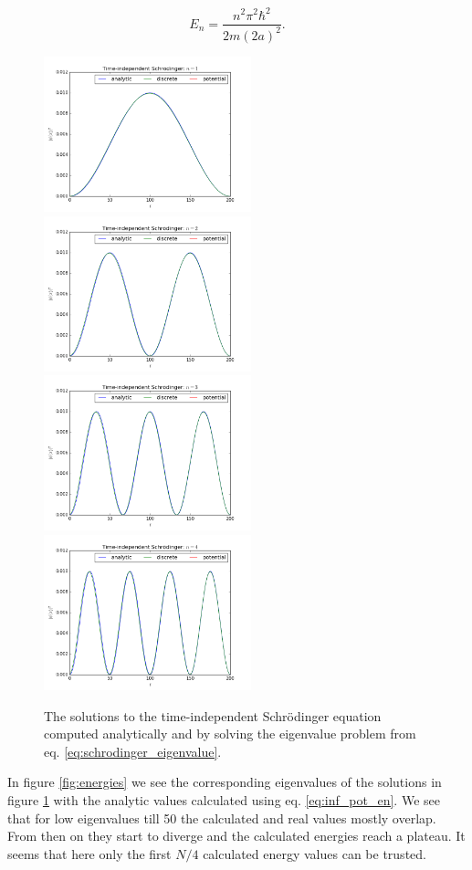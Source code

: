 \documentclass[a4paper]{article}
\begin{document}
\begin{equation} \label{eq:inf_pot_en}
    E_n = \frac{n^2 \pi^2 \hbar^2}{2m(2a)^2}.
\end{equation}

\begin{figure}
\centering
\includegraphics[width=6cm]{infinite_1}
\includegraphics[width=6cm]{infinite_2}
\includegraphics[width=6cm]{infinite_3}
\includegraphics[width=6cm]{infinite_4}
\caption{The solutions to the time-independent Schr\"odinger equation computed analytically and by solving the eigenvalue problem from eq. \ref{eq:schrodinger_eigenvalue}.}
\label{fig:infinite}
\end{figure}

In figure \ref{fig:energies} we see the corresponding eigenvalues of the solutions in figure \ref{fig:infinite} with the analytic values calculated using eq. \ref{eq:inf_pot_en}. We see that for low eigenvalues till 50 the calculated and real values mostly overlap. From then on they start to diverge and the calculated energies reach a plateau. It seems that here only the first $N/4$ calculated energy values can be trusted.
\end{document}
